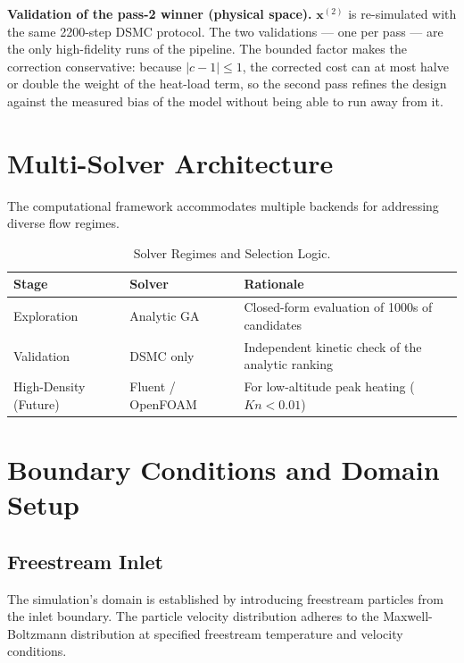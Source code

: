 \textbf{Validation of the pass-2 winner (physical space).} $\mathbf{x}^{(2)}$ is re-simulated with the same 2200-step DSMC protocol. The two validations --- one per pass --- are the only high-fidelity runs of the pipeline. The bounded factor makes the correction conservative: because $|c-1| \leq 1$, the corrected cost can at most halve or double the weight of the heat-load term, so the second pass refines the design against the measured bias of the model without being able to run away from it.

\section{Multi-Solver Architecture}

The computational framework accommodates multiple backends for addressing diverse flow regimes.

\begin{table}[H]
    \centering
    \caption{Solver Regimes and Selection Logic.}
    \label{tab:solver_regimes}
    \begin{tabularx}{\textwidth}{|l|>{\RaggedRight\arraybackslash}p{}|>{\RaggedRight\arraybackslash}X|}
        \hline
        \textbf{Stage} & \textbf{Solver} & \textbf{Rationale} \\ \hline
        Exploration & Analytic GA & Closed-form evaluation of 1000s of candidates \\ \hline
        Validation & DSMC only & Independent kinetic check of the analytic ranking \\ \hline
        High-Density (Future) & Fluent / OpenFOAM & For low-altitude peak heating ($Kn < 0.01$) \\ \hline
    \end{tabularx}
\end{table}

\section{Boundary Conditions and Domain Setup}

\subsection{Freestream Inlet}
The simulation's domain is established by introducing freestream particles from the inlet boundary. The particle velocity distribution adheres to the Maxwell-Boltzmann distribution at specified freestream temperature and velocity conditions.

